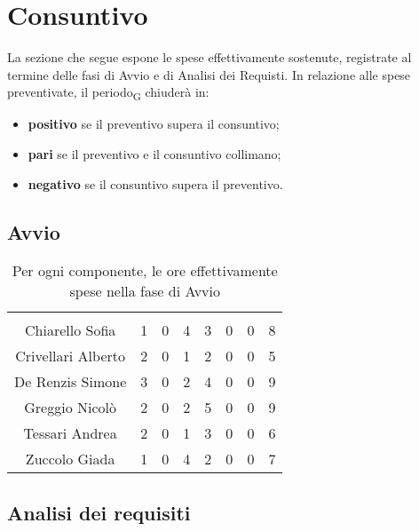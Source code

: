 \section{Consuntivo}

La sezione che segue espone le spese effettivamente sostenute, registrate al termine delle fasi di Avvio e di Analisi dei Requisti. In relazione alle spese preventivate, il \gls{periodo}\textsubscript{G} chiuderà in:
\begin{itemize}
	\item \textbf{positivo} se il preventivo supera il consuntivo;
	\item \textbf{pari} se il preventivo e il consuntivo collimano;
	\item \textbf{negativo} se il consuntivo supera il preventivo.
\end{itemize}


\subsection{Avvio}

\begin{table}[H]
	\begin{center}
		\begin{tabular}{c
				!{\color[HTML]{9b240a}\vrule width 1pt}
				cccccc
				!{\color[HTML]{9b240a}\vrule width 1pt}	
				c}
			\rowcolorhead
			 &  &  &  &  &  &  &  \\
			
			Chiarello Sofia & 1 & 0 & 4 & 3 & 0 & 0 & 8\\
			Crivellari Alberto & 2 & 0 & 1 & 2 & 0 & 0 & 5\\
			De Renzis Simone & 3 & 0 & 2 & 4 & 0 & 0 & 9\\
			Greggio Nicolò & 2 & 0 & 2 & 5 & 0 & 0 & 9\\
			Tessari Andrea & 2 & 0 & 1 & 3 & 0 & 0 & 6\\
			Zuccolo Giada & 1 & 0 & 4 & 2 & 0 & 0 & 7\\
		\end{tabular}
		\caption[Consuntivo fase di Avvio]{Per ogni componente, le ore effettivamente spese nella fase di Avvio}
	\end{center}
\end{table}




\subsection{Analisi dei requisiti}

